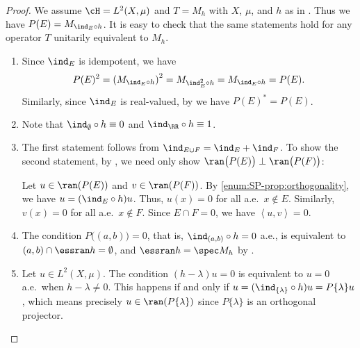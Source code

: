 \documentclass[oneside,reqno,letterpaper]{amsart}
\begin{document}
\begin{proof}
  We assume \(\cH = L^2(X, \mu)\) and \(T = M_h\) with \(X\), \(\mu\), and \(h\) as in . 
  Thus we have \(P(E) = M_{\ind_{E} \circ h}\). 
  It is easy to check that the same statements hold for any operator \(T\) unitarily equivalent to \(M_{h}\). 
  \begin{enumerate}[label=(\alph*)]
  \item %
    Since \(\ind_{E}\) is idempotent, we have 
    \[
      P(E)^2
      = \left( M_{\ind_{E} \circ h} \right)^2
      = M_{\ind_{E}^2 \circ h}
      = M_{\ind_{E} \circ h}
      = P(E) . 
    \] 
    Similarly, since \(\ind_{E}\) is real-valued, by  we have \(P(E)^* = P(E)\). 

  \item %
    Note that \(\ind_{\emptyset} \circ h \equiv 0\) and \(\ind_{\RR} \circ h \equiv 1\). 

  \item %
    The first statement follows from \(\ind_{E \cup F} = \ind_{E} + \ind_{F}\). 
    To show the second statement, by , we need only show \(\ran\big(P(E)\big) \perp \ran\big(P(F)\big)\):

    Let \(u \in \ran(P(E))\) and \(v \in \ran(P(F))\). 
    By \ref{enum:SP-prop:orthogonality}, we have \(u = (\ind_{E} \circ h) u\). 
    Thus, \(u(x) = 0\) for all  a.e.\ \(x \not\in E\). 
    Similarly, \(v(x) = 0\) for all a.e.\ \(x \not\in F\). 
    Since \(E \cap F = 0\), we have  \(\left< u, v \right> = 0\). 

  \item %
    The condition \(P\big((a, b)\big) = 0\), that is, \(\ind_{(a, b)} \circ h = 0\) a.e., is equivalent to \((a, b) \cap \essran h = \emptyset\), and \(\essran h = \spec M_{h}\) by . 

  \item %
    Let \(u \in L^2(X, \mu)\). 
    The condition \((h - \lambda) u = 0\) is equivalent to \(u = 0\) a.e.\ when \(h - \lambda \neq 0\). 
    This happens if and only if \(u = (\ind_{\{\lambda\}} \circ h) u = P\{\lambda\} u\), which means precisely \(u \in \ran(P \{\lambda\})\) since \(P \{\lambda\}\) is an orthogonal projector. 
  \end{enumerate}
\end{proof}
\end{document}
